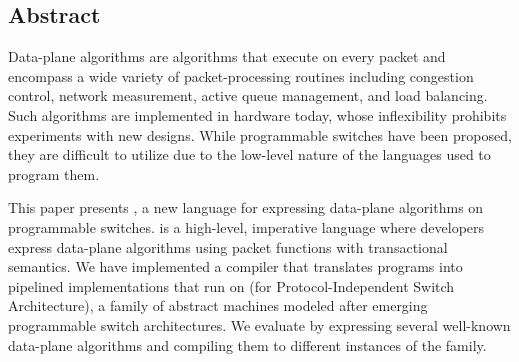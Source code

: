 \subsection*{Abstract}

Data-plane algorithms are algorithms that execute on every packet and encompass
a wide variety of packet-processing routines including congestion control,
network measurement, active queue management, and load balancing. Such 
algorithms are implemented in hardware today, whose inflexibility prohibits
experiments with new designs. While programmable switches have been proposed, 
they are difficult to utilize due to the low-level nature of the languages
used to program them.

This paper presents \pktlanguage, a new language for expressing data-plane
algorithms on programmable switches. \pktlanguage is a high-level, imperative
language where developers express data-plane algorithms using packet functions
with transactional semantics. We have implemented a compiler that translates
\pktlanguage programs into pipelined implementations that run on \absmachine (for
Protocol-Independent Switch Architecture), a
family of abstract machines modeled after emerging programmable switch
architectures. We evaluate \pktlanguage by expressing several well-known
data-plane algorithms and compiling them to different instances of the
\absmachine family.
